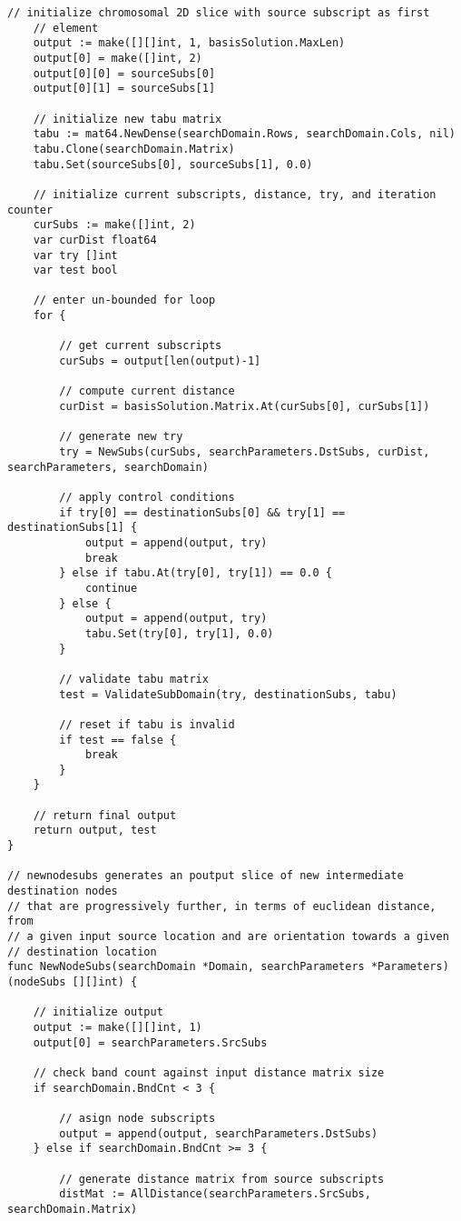 \begin{lstlisting}[basicstyle=\tiny]
	// initialize chromosomal 2D slice with source subscript as first
	// element
	output := make([][]int, 1, basisSolution.MaxLen)
	output[0] = make([]int, 2)
	output[0][0] = sourceSubs[0]
	output[0][1] = sourceSubs[1]

	// initialize new tabu matrix
	tabu := mat64.NewDense(searchDomain.Rows, searchDomain.Cols, nil)
	tabu.Clone(searchDomain.Matrix)
	tabu.Set(sourceSubs[0], sourceSubs[1], 0.0)

	// initialize current subscripts, distance, try, and iteration counter
	curSubs := make([]int, 2)
	var curDist float64
	var try []int
	var test bool

	// enter un-bounded for loop
	for {

		// get current subscripts
		curSubs = output[len(output)-1]

		// compute current distance
		curDist = basisSolution.Matrix.At(curSubs[0], curSubs[1])

		// generate new try
		try = NewSubs(curSubs, searchParameters.DstSubs, curDist, searchParameters, searchDomain)

		// apply control conditions
		if try[0] == destinationSubs[0] && try[1] == destinationSubs[1] {
			output = append(output, try)
			break
		} else if tabu.At(try[0], try[1]) == 0.0 {
			continue
		} else {
			output = append(output, try)
			tabu.Set(try[0], try[1], 0.0)
		}

		// validate tabu matrix
		test = ValidateSubDomain(try, destinationSubs, tabu)

		// reset if tabu is invalid
		if test == false {
			break
		}
	}

	// return final output
	return output, test
}

// newnodesubs generates an poutput slice of new intermediate destination nodes
// that are progressively further, in terms of euclidean distance, from
// a given input source location and are orientation towards a given
// destination location
func NewNodeSubs(searchDomain *Domain, searchParameters *Parameters) (nodeSubs [][]int) {

	// initialize output
	output := make([][]int, 1)
	output[0] = searchParameters.SrcSubs

	// check band count against input distance matrix size
	if searchDomain.BndCnt < 3 {

		// asign node subscripts
		output = append(output, searchParameters.DstSubs)
	} else if searchDomain.BndCnt >= 3 {

		// generate distance matrix from source subscripts
		distMat := AllDistance(searchParameters.SrcSubs, searchDomain.Matrix)


\end{lstlisting}
